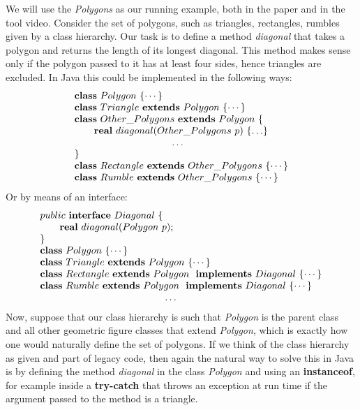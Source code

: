 \documentclass[runningheads]{llncs}
\begin{document}
\begin{example}
We will use the \emph{Polygons} as our running example, both in the paper and in the tool video.
Consider the set of polygons, such as triangles, rectangles, rumbles given by a class hierarchy.
Our task is to define a method \emph{diagonal} that takes a polygon and returns the length of its longest diagonal. This method makes sense only if the polygon passed to it has at least four sides, hence triangles are excluded.
In Java this could be implemented in the following ways:
$$
\begin{array}{l}
\synclass Polygon \ \{ \cdots\}
\\
\syndecl{Triangle}{Polygon} {\cdots}
\\
\syndecl{Other\_Polygons}{Polygon} {
\\
	\qquad \mathbf{real}\ diagonal(Other\_Polygons \ p)\ \{\ldots \}
	\\
	\hspace{3.5cm} \ldots
	\\
}
\\
\syndecl{Rectangle}{Other\_Polygons}{\cdots}
\\
\syndecl{Rumble}{Other\_Polygons} {\cdots}
\end{array}
$$
Or by means of an interface:
$$
\begin{array}{l}
public \ \syninterface Diagonal\ \{
	\\
	\qquad \mathbf{real}\ diagonal(Polygon \ p);
	\\
\}
\\
\synclass Polygon \ \{\cdots\}
\\
\syndecl{Triangle}{Polygon} {\cdots}
\\
\synidecl{Rectangle}{Polygon} \synimpl Diagonal \ \{\cdots\}
\\
\synidecl{Rumble}{Polygon} \synimpl Diagonal \ \{\cdots\}
\\
\hspace{4.5cm} \ldots
\end{array}
$$
Now, suppose that our class hierarchy is such that \emph{Polygon} is the parent class and all other geometric figure classes that extend \emph{Polygon}, which is exactly how one would naturally define the set of polygons. If we think of the class hierarchy as given and part of legacy code, then again the natural way to solve this in Java is by defining the method \emph{diagonal} in the class \emph{Polygon} and using an \textbf{instanceof}, for example inside a \textbf{try-catch} that throws an exception at run time if the argument passed to the method is a triangle.


\end{example}
\end{document}
